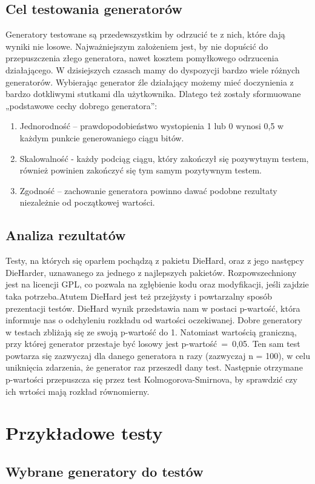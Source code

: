 \documentclass[11pt]{aghdpl}
\begin{document}
\subsection{Cel testowania generatorów}
Generatory testowane są przedewszystkim by odrzucić te z nich, które dają wyniki nie losowe. Najważniejszym założeniem jest, by nie dopuścić do przepuszczenia złego generatora, nawet kosztem pomyłkowego odrzucenia działającego. W dzisiejszych czasach mamy do dyspozycji bardzo wiele różnych generatorów. Wybierając generator źle działający możemy mieć doczynienia z bardzo dotkliwymi stutkami dla użytkownika. Dlatego też zostały sformuowane „podstawowe cechy dobrego generatora”:
\begin{enumerate}
\item Jednorodność – prawdopodobieństwo wystopienia 1 lub 0 wynosi 0,5 w każdym punkcie generowaniego ciągu bitów.
\item Skalowalność - każdy podciąg ciągu, który zakończył się pozywytnym testem, również powinien zakończyć się tym samym pozytywnym testem.
\item Zgodność – zachowanie generatora powinno dawać podobne rezultaty niezależnie od początkowej wartości.
\end{enumerate}
\subsection{Analiza rezultatów}
Testy, na których się oparłem pochądzą z pakietu DieHard, oraz z jego następcy DieHarder, uznawanego za jednego z najlepszych pakietów. Rozpowszechniony jest na licencji GPL, co pozwala na zgłębienie kodu oraz modyfikacji, jeśli zajdzie taka potrzeba.Atutem DieHard jest też przejżysty i powtarzalny sposób prezentacji testów. DieHard wynik przedstawia nam w postaci p-wartość, która informuje nas o odchyleniu rozkładu od wartości oczekiwanej. Dobre generatory w testach zbliżają się ze swoją p-wartość do 1. Natomiast wartością graniczną, przy której generator przestaje być losowy jest p-wartość~=~0,05. 
Ten sam test powtarza się zazwyczaj dla danego generatora n razy (zazwyczaj n = 100), w celu uniknięcia zdarzenia, że generator raz przeszedł dany test. Następnie otrzymane p-wartości przepuszcza się przez test Kolmogorova-Smirnova, by sprawdzić czy ich wrtości mają rozkład równomierny.
\section{Przykładowe testy}
\subsection{Wybrane generatory do testów}
\end{document}
